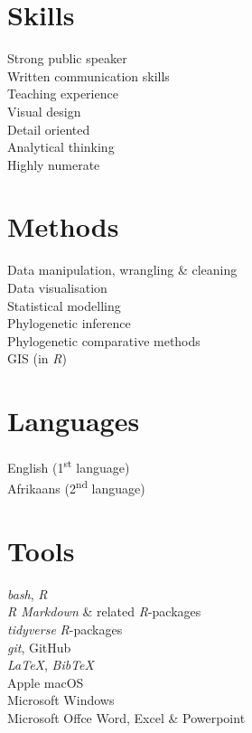 \documentclass[10pt]{article}
\begin{document}
\begin{multicols}{2}

\section*{Skills} %

Strong public speaker \\
Written communication skills \\
Teaching experience \\
Visual design \\
Detail oriented \\
Analytical thinking \\
Highly numerate

\section*{Methods} %

Data manipulation, wrangling \& cleaning \\
Data visualisation \\
Statistical modelling \\
Phylogenetic inference \\
Phylogenetic comparative methods \\
GIS (in \textit{R})

\columnbreak

\section*{Languages} %

English (1\textsuperscript{st} language) \\
Afrikaans (2\textsuperscript{nd} language)

\section*{Tools} %

\textit{bash}, \textit{R} \\
\textit{R Markdown} \& related \textit{R}-packages \\
\textit{tidyverse} \textit{R}-packages \\
\textit{git}, GitHub \\
\textit{LaTeX}, \textit{BibTeX} \\
Apple macOS \\
Microsoft Windows \\
Microsoft Offce Word, Excel \& Powerpoint

\end{multicols}
\end{document}
